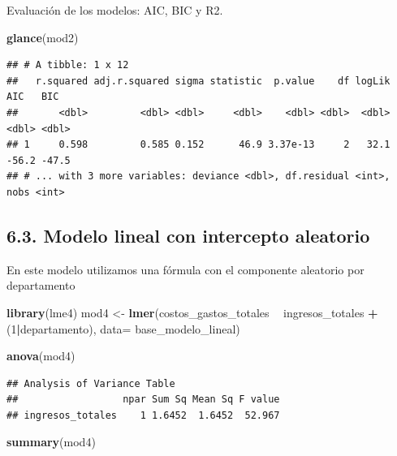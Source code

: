 \documentclass[
  11pt,
  a4paper,
]{book}
\newenvironment{Shaded}{\begin{snugshade}}{\end{snugshade}}
\newcommand{\DataTypeTok}[1]{\textcolor[rgb]{0.13,0.29,0.53}{#1}}
\newcommand{\DecValTok}[1]{\textcolor[rgb]{0.00,0.00,0.81}{#1}}
\newcommand{\KeywordTok}[1]{\textcolor[rgb]{0.13,0.29,0.53}{\textbf{#1}}}
\newcommand{\NormalTok}[1]{#1}
\newcommand{\OperatorTok}[1]{\textcolor[rgb]{0.81,0.36,0.00}{\textbf{#1}}}
\newcommand{\StringTok}[1]{\textcolor[rgb]{0.31,0.60,0.02}{#1}}
\begin{document}
Evaluación de los modelos: AIC, BIC y R2.

\begin{Shaded}
\begin{Highlighting}[]
\KeywordTok{glance}\NormalTok{(mod2)}
\end{Highlighting}
\end{Shaded}

\begin{verbatim}
## # A tibble: 1 x 12
##   r.squared adj.r.squared sigma statistic  p.value    df logLik   AIC   BIC
##       <dbl>         <dbl> <dbl>     <dbl>    <dbl> <dbl>  <dbl> <dbl> <dbl>
## 1     0.598         0.585 0.152      46.9 3.37e-13     2   32.1 -56.2 -47.5
## # ... with 3 more variables: deviance <dbl>, df.residual <int>, nobs <int>
\end{verbatim}

\hypertarget{modelo-lineal-con-intercepto-aleatorio}{%
\subsection{6.3. Modelo lineal con intercepto
aleatorio}\label{modelo-lineal-con-intercepto-aleatorio}}

En este modelo utilizamos una fórmula con el componente aleatorio por
departamento

\begin{Shaded}
\begin{Highlighting}[]
\KeywordTok{library}\NormalTok{(lme4)}
\NormalTok{mod4 <-}\StringTok{ }\KeywordTok{lmer}\NormalTok{(costos_gastos_totales }\OperatorTok{~}\StringTok{ }\NormalTok{ingresos_totales }\OperatorTok{+}\StringTok{ }\NormalTok{(}\DecValTok{1}\OperatorTok{|}\NormalTok{departamento), }
             \DataTypeTok{data=}\NormalTok{ base_modelo_lineal) }

\KeywordTok{anova}\NormalTok{(mod4)}
\end{Highlighting}
\end{Shaded}

\begin{verbatim}
## Analysis of Variance Table
##                  npar Sum Sq Mean Sq F value
## ingresos_totales    1 1.6452  1.6452  52.967
\end{verbatim}

\begin{Shaded}
\begin{Highlighting}[]
\KeywordTok{summary}\NormalTok{(mod4)}
\end{Highlighting}
\end{Shaded}
\end{document}
